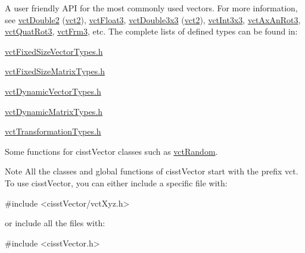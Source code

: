 \begin{DoxyItemize}
\item A user friendly A\+P\+I for the most commonly used vectors. For more information, see \hyperlink{vct_fixed_size_vector_types_8h_afc0fdcc41cbe8b043747612501610812}{vct\+Double2} (\hyperlink{vct_fixed_size_vector_types_8h_a88481ac3c794867ba5e4e92624f0d958}{vct2}), \hyperlink{vct_fixed_size_vector_types_8h_a86116f095b661a1ffb5f630c06ee258d}{vct\+Float3}, \hyperlink{vct_fixed_size_matrix_types_8h_a7278d810c510a7a8ebd38de1c8d80970}{vct\+Double3x3} (\hyperlink{vct_fixed_size_vector_types_8h_a88481ac3c794867ba5e4e92624f0d958}{vct2}), \hyperlink{vct_fixed_size_matrix_types_8h_a59789252579c8ed0c5841af643951107}{vct\+Int3x3}, \hyperlink{vct_transformation_types_8h_ac2733d98f3965180e67f7a21b7ee4582}{vct\+Ax\+An\+Rot3}, \hyperlink{vct_transformation_types_8h_a595c3c83888ed4fb8ae707126efd25e3}{vct\+Quat\+Rot3}, \hyperlink{vct_transformation_types_8h_a81feda0a02c2d1bc26e5553f409fed20}{vct\+Frm3}, etc. The complete lists of defined types can be found in\+: 
\begin{DoxyItemize}
\item \hyperlink{vct_fixed_size_vector_types_8h}{vct\+Fixed\+Size\+Vector\+Types.\+h} 
\item \hyperlink{vct_fixed_size_matrix_types_8h}{vct\+Fixed\+Size\+Matrix\+Types.\+h} 
\item \hyperlink{vct_dynamic_vector_types_8h}{vct\+Dynamic\+Vector\+Types.\+h} 
\item \hyperlink{vct_dynamic_matrix_types_8h}{vct\+Dynamic\+Matrix\+Types.\+h} 
\item \hyperlink{vct_transformation_types_8h}{vct\+Transformation\+Types.\+h} 
\end{DoxyItemize}
\item Some functions for cisst\+Vector classes such as \hyperlink{group__cisst_vector_ga515b69d58d116cfb3465c9bb6b9e05dc}{vct\+Random}.
\end{DoxyItemize}

\begin{DoxyNote}{Note}
All the classes and global functions of cisst\+Vector start with the prefix vct. To use cisst\+Vector, you can either include a specific file with\+: 
\begin{DoxyCode}
\textcolor{preprocessor}{#include <cisstVector/vctXyz.h>}
\end{DoxyCode}
 or include all the files with\+: 
\begin{DoxyCode}
\textcolor{preprocessor}{#include <cisstVector.h>}
\end{DoxyCode}
 
\end{DoxyNote}


